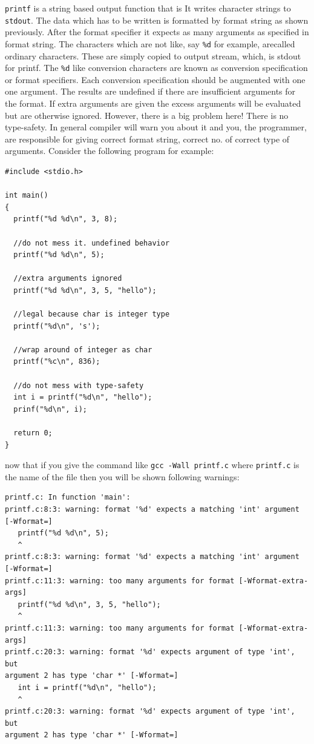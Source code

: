 \texttt{printf} is a string based output function that is It writes character
strings to \texttt{stdout}. The data which has to be written is formatted by
format string as shown previously. After the format specifier it expects as
many arguments as specified in format string. The characters which are not
like, say \texttt{\%d} for example, arecalled ordinary characters. These are
simply copied to output stream, which, is stdout for printf. The \texttt{\%d}
like conversion characters are known as conversion specification or format
specifiers. Each conversion specification should be augmented with one one
argument. The results are undefined if there are insufficient arguments for the
format. If extra arguments are given the excess arguments will be evaluated but
are otherwise ignored. However, there is a big problem here! There is no
type-safety. In general compiler will warn you about it and you, the
programmer, are responsible for giving correct format string, correct no. of
correct type of arguments. Consider the following program for example:

\begin{verbatim}
#include <stdio.h>

int main()
{
  printf("%d %d\n", 3, 8);

  //do not mess it. undefined behavior
  printf("%d %d\n", 5);

  //extra arguments ignored
  printf("%d %d\n", 3, 5, "hello");

  //legal because char is integer type
  printf("%d\n", 's');

  //wrap around of integer as char
  printf("%c\n", 836);

  //do not mess with type-safety
  int i = printf("%d\n", "hello");
  prinf("%d\n", i);

  return 0;
}
\end{verbatim}

now that if you give the command like \texttt{gcc -Wall printf.c} where
\texttt{printf.c} is the name of the file then you will be shown following
warnings:

\begin{Verbatim}[frame=single]
printf.c: In function 'main':
printf.c:8:3: warning: format '%d' expects a matching 'int' argument [-Wformat=]
   printf("%d %d\n", 5);
   ^
printf.c:8:3: warning: format '%d' expects a matching 'int' argument [-Wformat=]
printf.c:11:3: warning: too many arguments for format [-Wformat-extra-args]
   printf("%d %d\n", 3, 5, "hello");
   ^
printf.c:11:3: warning: too many arguments for format [-Wformat-extra-args]
printf.c:20:3: warning: format '%d' expects argument of type 'int', but
argument 2 has type 'char *' [-Wformat=]
   int i = printf("%d\n", "hello");
   ^
printf.c:20:3: warning: format '%d' expects argument of type 'int', but
argument 2 has type 'char *' [-Wformat=]
\end{Verbatim}

